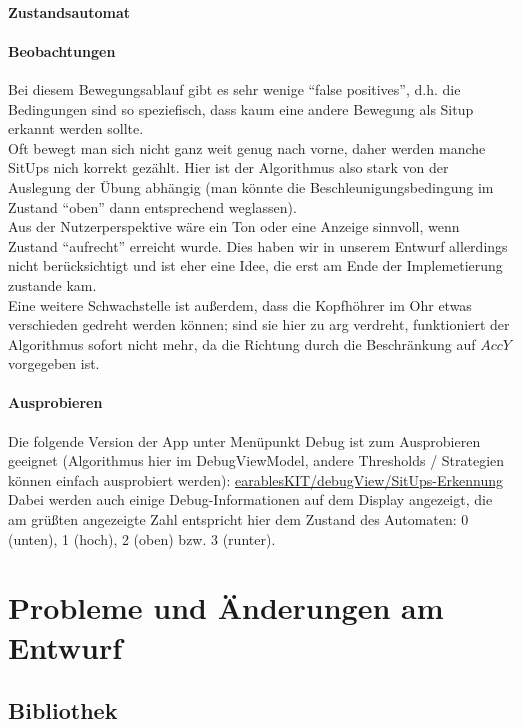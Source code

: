 \documentclass[a4paper,12pt]{article}
\begin{document}
\paragraph{Zustandsautomat}

\paragraph{Beobachtungen}
Bei diesem Bewegungsablauf gibt es sehr wenige ``false positives'', d.h. die Bedingungen sind so speziefisch, dass kaum eine andere Bewegung als Situp erkannt werden sollte.\\
Oft bewegt man sich nicht ganz weit genug nach vorne, daher werden manche SitUps nich korrekt gezählt. Hier ist der Algorithmus also stark von der Auslegung der Übung abhängig (man könnte die Beschleunigungsbedingung im Zustand ``oben'' dann entsprechend weglassen).\\
Aus der Nutzerperspektive wäre ein Ton oder eine Anzeige sinnvoll, wenn Zustand ``aufrecht'' erreicht wurde. Dies haben wir in unserem Entwurf allerdings nicht berücksichtigt und ist eher eine Idee, die erst am Ende der Implemetierung zustande kam.\\
Eine weitere Schwachstelle ist außerdem, dass die Kopfhöhrer im Ohr etwas verschieden gedreht werden können; sind sie hier zu arg verdreht, funktioniert der Algorithmus sofort nicht mehr, da die Richtung durch die Beschränkung auf $AccY$ vorgegeben ist.
\paragraph{Ausprobieren}
Die folgende Version der App unter Menüpunkt Debug ist zum Ausprobieren geeignet (Algorithmus hier im DebugViewModel, andere Thresholds / Strategien können einfach ausprobiert werden): 
\href{https://github.com/vlle1/earablesKIT/tree/cd774e370156ea3d13eff2879a2d7f0f7d541260}{earablesKIT/debugView/SitUps-Erkennung}\\
Dabei werden auch einige Debug-Informationen auf dem Display angezeigt, die am grüßten angezeigte Zahl entspricht hier dem Zustand des Automaten: 0 (unten), 1 (hoch), 2 (oben) bzw. 3 (runter).
\clearpage

\section{Probleme und Änderungen am Entwurf}
\label{aenderungen}
\subsection{Bibliothek}
\end{document}
